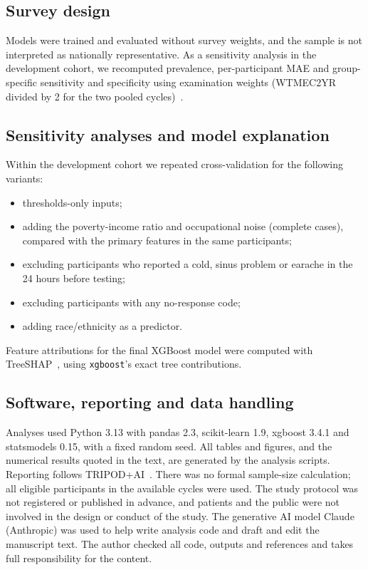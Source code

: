 \documentclass[11pt]{article}
\begin{document}
\subsection*{Survey design}
Models were trained and evaluated without survey weights, and the sample is not interpreted as nationally representative. As a sensitivity analysis in the development cohort, we recomputed prevalence, per-participant MAE and group-specific sensitivity and specificity using examination weights (WTMEC2YR divided by 2 for the two pooled cycles)~\cite{nhanes_weights}.

\subsection*{Sensitivity analyses and model explanation}
Within the development cohort we repeated cross-validation for the following variants:
\begin{itemize}
\item thresholds-only inputs;
\item adding the poverty-income ratio and occupational noise (complete cases), compared with the primary features in the same participants;
\item excluding participants who reported a cold, sinus problem or earache in the 24 hours before testing;
\item excluding participants with any no-response code;
\item adding race/ethnicity as a predictor.
\end{itemize}
Feature attributions for the final XGBoost model were computed with TreeSHAP~\cite{lundberg2020}, using \texttt{xgboost}'s exact tree contributions.

\subsection*{Software, reporting and data handling}
Analyses used Python 3.13 with pandas 2.3, scikit-learn 1.9, xgboost 3.4.1 and statsmodels 0.15, with a fixed random seed. All tables and figures, and the numerical results quoted in the text, are generated by the analysis scripts. Reporting follows TRIPOD+AI~\cite{collins2024}. There was no formal sample-size calculation; all eligible participants in the available cycles were used. The study protocol was not registered or published in advance, and patients and the public were not involved in the design or conduct of the study. The generative AI model Claude (Anthropic) was used to help write analysis code and draft and edit the manuscript text. The author checked all code, outputs and references and takes full responsibility for the content.
\end{document}
